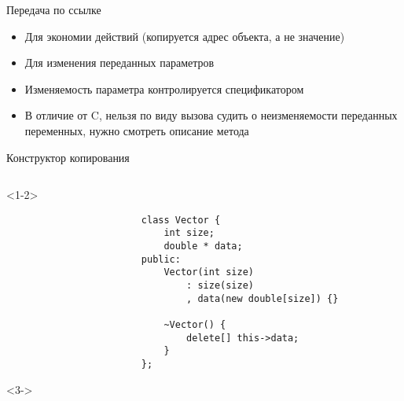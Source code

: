 \documentclass[aspectratio=169,14pt]{beamer}
\begin{document}
    \begin{frame}{Передача по ссылке}
        \begin{itemize}
            \item Для экономии действий (копируется адрес объекта, а не значение)
            \item Для изменения переданных параметров
            \item Изменяемость параметра контролируется спецификатором 
            \item В отличие от C, нельзя по виду вызова судить о неизменяемости переданных переменных, нужно смотреть описание метода
        \end{itemize}
    \end{frame}

    \begin{frame}[fragile]{Конструктор копирования}
        \begin{columns}[T]
            \begin{column}{0.6\textwidth}
                \begin{onlyenv}<1-2>
                    \begin{verbatim}
                        class Vector {
                            int size;
                            double * data;
                        public:
                            Vector(int size)
                                : size(size)
                                , data(new double[size]) {}

                            ~Vector() {
                                delete[] this->data;
                            }
                        };
                    \end{verbatim}
                \end{onlyenv}
                \begin{onlyenv}<3->
\end{onlyenv}
\end{column}
\end{columns}
\end{frame}
\end{document}
